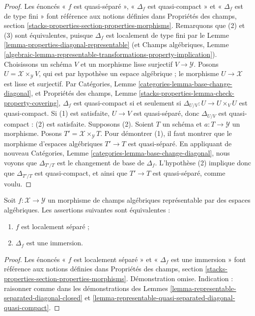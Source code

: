 \begin{proof}
Les énoncés « $f$ est quasi-séparé », « $\Delta_f$ est quasi-compact » et
« $\Delta_f$ est de type fini » font référence aux notions définies dans
Propriétés des champs,
section \ref{stacks-properties-section-properties-morphisms}. Remarquons que
(2) et (3) sont équivalentes, puisque $\Delta_f$ est localement de type fini
par le Lemme \ref{lemma-properties-diagonal-representable} (et Champs
algébriques, Lemme
\ref{algebraic-lemma-representable-transformations-property-implication}).
Choisissons un schéma $V$ et un morphisme lisse surjectif
$V\to\mathcal{Y}$. Posons $U=\mathcal{X}\times_\mathcal{Y}V$, qui est par
hypothèse un espace algébrique ; le morphisme $U\to\mathcal{X}$ est lisse et
surjectif. Par Catégories, Lemme
\ref{categories-lemma-base-change-diagonal}, et Propriétés des champs, Lemme
\ref{stacks-properties-lemma-check-property-covering}, $\Delta_f$ est
quasi-compact si et seulement si
$\Delta_{U/V}:U\to U\times_VU$ est quasi-compact. Si (1) est satisfaite,
$U\to V$ est quasi-séparé, donc $\Delta_{U/V}$ est quasi-compact : (2) est
satisfaite. Supposons (2). Soient $T$ un schéma et
$a:T\to\mathcal{Y}$ un morphisme. Posons
$T'=\mathcal{X}\times_\mathcal{Y}T$. Pour démontrer (1), il faut montrer que
le morphisme d'espaces algébriques $T'\to T$ est quasi-séparé. En appliquant
de nouveau Catégories, Lemme \ref{categories-lemma-base-change-diagonal}, nous
voyons que $\Delta_{T'/T}$ est le changement de base de $\Delta_f$.
L'hypothèse (2) implique donc que $\Delta_{T'/T}$ est quasi-compact, et ainsi
que $T'\to T$ est quasi-séparé, comme voulu.
\end{proof}

\begin{lemma}
\label{lemma-representable-locally-separated-diagonal-immersion}
Soit $f:\mathcal{X}\to\mathcal{Y}$ un morphisme de champs algébriques
représentable par des espaces algébriques. Les assertions suivantes sont
équivalentes :
\begin{enumerate}
\item $f$ est localement séparé ;
\item $\Delta_f$ est une immersion.
\end{enumerate}
\end{lemma}

\begin{proof}
Les énoncés « $f$ est localement séparé » et « $\Delta_f$ est une immersion »
font référence aux notions définies dans Propriétés des champs,
section \ref{stacks-properties-section-properties-morphisms}.
Démonstration omise. Indication : raisonner comme dans les démonstrations des
Lemmes \ref{lemma-representable-separated-diagonal-closed} et
\ref{lemma-representable-quasi-separated-diagonal-quasi-compact}.
\end{proof}






